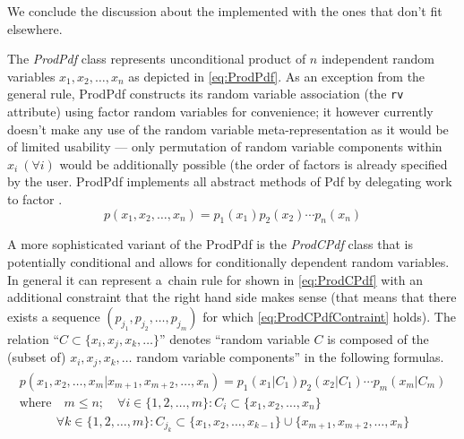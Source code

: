 We conclude the discussion about the implemented {\pdfs} with the ones that don't fit elsewhere.

The \emph{ProdPdf} class represents unconditional product of \(n\) independent random variables
\(x_1, x_2, \dotsc, x_n\) as depicted in \eqref{eq:ProdPdf}. As an exception from the general rule,
ProdPdf constructs its random variable association (the \verb|rv| attribute) using factor random
variables for convenience; it however currently doesn't make any use of the random variable
meta-representation as it would be of limited usability --- only permutation of random variable
components within \(x_i ~ (\forall i)\) would be additionally possible (the order of factors is
already specified by the user. ProdPdf implements all abstract methods of Pdf by delegating work to
factor {\pdfs}.
\begin{equation} \label{eq:ProdPdf}
	p(x_1, x_2, \dotsc, x_n) = p_1(x_1) p_2(x_2) \dotsm p_n(x_n)
\end{equation}

A more sophisticated variant of the ProdPdf is the \emph{ProdCPdf} class that is potentially
conditional and allows for conditionally dependent random variables. In general it can represent
a~chain rule for
{\pdfs} shown in \eqref{eq:ProdCPdf} with an additional constraint that the right hand side makes
sense (that means that there exists a sequence \((p_{j_1}, p_{j_2}, \dotsc, p_{j_m})\) for which
\eqref{eq:ProdCPdfContraint} holds). The relation ``\(C \subset \{x_i, x_j, x_k, \dotsc\}\)'' denotes
``random variable \(C\) is composed of the (subset of) \(x_i, x_j, x_k, \dotsc\) random variable components''
in the following formulas.
\begin{gather} \label{eq:ProdCPdf}
	\begin{gathered}
		p(x_1, x_2, \dotsc, x_m | x_{m+1}, x_{m+2} , \dotsc, x_n) = p_1(x_1 | C_1)
			p_2(x_2 | C_1) \dotsm p_m(x_m | C_m) \\
		\text{where} \quad m \leq n; \quad
			\forall i \in \{1, 2, \dotsc, m\}: C_i \subset \{x_1, x_2, \dotsc, x_n\}
	\end{gathered}
\end{gather}
\begin{equation} \label{eq:ProdCPdfContraint}
	\forall k \in \{1, 2, \dotsc, m\}: C_{j_k} \subset \{x_1, x_2, \dotsc, x_{k-1}\} \cup \{x_{m+1}, x_{m+2} , \dotsc, x_n\}
\end{equation}

